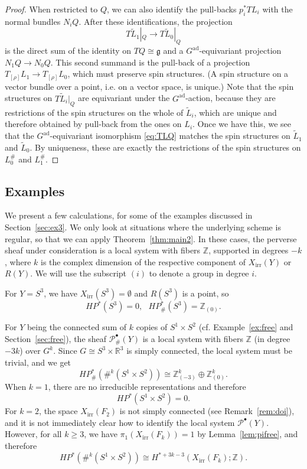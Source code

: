 \documentclass [11pt]{amsart}
\theoremstyle{remark}
\def\zz {{\mathbb{Z}}}
\def\rr {{\mathbb{R}}}
\def\R{\rr}
\def\Z {\zz}
\def\g{\mathfrak{g}}
\def\Gad{G^{\operatorname{ad}}}
\def\HP{\mathit{HP}}
\def\Rep {R}
\def\Char {X}
\def\CharIrr {\Char_{\operatorname{irr}}}
\def\P {\mathcal{P}}
\def\HPf{\HP_{\! \#}}
\def\tL{\tilde{L}}
\begin{document}
\begin{proof}
When restricted to $Q$, we can also identify the pull-backs $p_i^*TL_i$ with the normal bundles $N_iQ$. After these identifications, the projection 
\begin{equation}
\label{eq:TLQ}
T\tL_1|_Q \to T\tL_0|_Q
\end{equation} is the direct sum of the identity on $TQ \cong \g$ and a $\Gad$-equivariant projection $N_1Q \to N_0Q$. This second summand is the pull-back of a projection $T_{[\rho]}L_1 \to T_{[\rho]}L_0$, which must preserve spin structures. (A spin structure on a vector bundle over a point, i.e. on a vector space, is unique.) Note that the spin structures on $T\tilde L_i|_Q$ are equivariant under the $\Gad$-action, because they are restrictions of the spin structures on the whole of $\tilde L_i$, which are unique and therefore obtained by pull-back from the ones on $L_i$. Once we have this, we see that the $\Gad$-equivariant isomorphism \eqref{eq:TLQ} matches the spin structures on $\tL_1$ and $\tL_0$. By uniqueness, these are exactly the restrictions of the spin structures on $L^{\#}_0$ and $L^{\#}_1$.
\end{proof}

\subsection{Examples}
We present a few calculations, for some of the examples discussed in Section~\ref{sec:ex3}. We only look at situations where the underlying scheme is regular, so that we can apply Theorem~\ref{thm:main2}. In these cases, the perverse sheaf under consideration is a local system with fibers $\Z$, supported in degrees $-k$, where $k$ is the complex dimension of the respective component of $\CharIrr(Y)$ or $\Rep(Y)$. We will use the subscript $(i)$ to denote a group in degree $i$.

For $Y=S^3$, we have $\CharIrr(S^3) =\emptyset$ and $\Rep(S^3)$ is a point, so
$$\HP^*(S^3)=0, \ \ \ \HPf^*(S^3) = \Z_{(0)}.$$

For $Y$ being the connected sum of $k$ copies of $S^1 \times S^2$ (cf. Example~\ref{ex:free} and Section~\ref{sec:free}), the sheaf $\P^{\bullet}_{\#}(Y)$ is a local system with fibers $\Z$ (in degree $-3k$) over $G^k$. Since $G \cong S^3 \times \R^3$ is simply connected, the local system must be trivial, and we get
$$ \HPf^*(\#^k (S^1 \times S^2)) \cong \Z^{k}_{(-3)} \oplus \Z^{k}_{(0)}.$$
When $k=1$, there are no irreducible representations and therefore 
$$ \HP^*(S^1 \times S^2)=0.$$
For $k=2$, the space $\CharIrr(F_2)$ is not simply connected (see Remark~\ref{rem:doi}), and it is not immediately clear how to identify the local system $\P^{\bullet}(Y)$. However, for all $k \geq 3$, we have $\pi_1(\CharIrr(F_k))=1$ by Lemma~\ref{lem:pifree}, and therefore 
$$\HP^*(\#^k (S^1 \times S^2)) \cong H^{*+3k-3}(\CharIrr(F_k); \Z).$$
\end{document}
